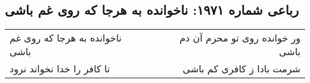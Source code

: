 \begin{center}
\section*{رباعی شماره ۱۹۷۱: ناخوانده به هرجا که روی غم باشی}
\label{sec:1971}
\begin{longtable}{l p{0.5cm} r}
ناخوانده به هرجا که روی غم باشی
&&
ور خوانده روی تو محرم آن دم باشی
\\
تا کافر را خدا نخواند نرود
&&
شرمت بادا ز کافری کم باشی
\\
\end{longtable}
\end{center}
